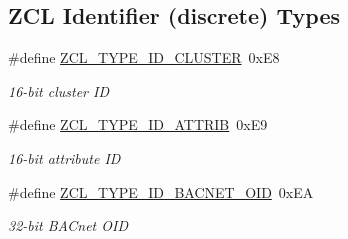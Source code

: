 \subsection*{Z\-C\-L Identifier (discrete) Types}
\begin{DoxyCompactItemize}
\item 
\hypertarget{group__zcl__types_gabf44aa40c12655d86c012c551bb6834e}{\#define \hyperlink{group__zcl__types_gabf44aa40c12655d86c012c551bb6834e}{Z\-C\-L\-\_\-\-T\-Y\-P\-E\-\_\-\-I\-D\-\_\-\-C\-L\-U\-S\-T\-E\-R}~0x\-E8}\label{group__zcl__types_gabf44aa40c12655d86c012c551bb6834e}

\begin{DoxyCompactList}\small\item\em 16-\/bit cluster I\-D \end{DoxyCompactList}\item 
\hypertarget{group__zcl__types_ga1dc09447fe0d1f047c4554975a11b3fa}{\#define \hyperlink{group__zcl__types_ga1dc09447fe0d1f047c4554975a11b3fa}{Z\-C\-L\-\_\-\-T\-Y\-P\-E\-\_\-\-I\-D\-\_\-\-A\-T\-T\-R\-I\-B}~0x\-E9}\label{group__zcl__types_ga1dc09447fe0d1f047c4554975a11b3fa}

\begin{DoxyCompactList}\small\item\em 16-\/bit attribute I\-D \end{DoxyCompactList}\item 
\hypertarget{group__zcl__types_ga59fe9efad9f60ec8176a13c0ab1019ac}{\#define \hyperlink{group__zcl__types_ga59fe9efad9f60ec8176a13c0ab1019ac}{Z\-C\-L\-\_\-\-T\-Y\-P\-E\-\_\-\-I\-D\-\_\-\-B\-A\-C\-N\-E\-T\-\_\-\-O\-I\-D}~0x\-E\-A}\label{group__zcl__types_ga59fe9efad9f60ec8176a13c0ab1019ac}

\begin{DoxyCompactList}\small\item\em 32-\/bit B\-A\-Cnet O\-I\-D \end{DoxyCompactList}\end{DoxyCompactItemize}
